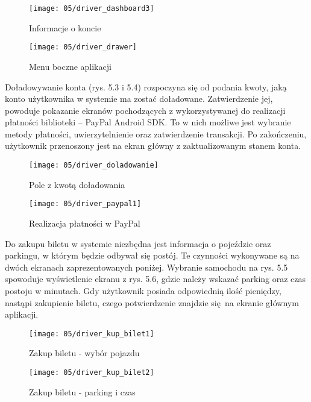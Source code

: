 \begin{figure}[h]
	\centering
	\begin{minipage}[b]{0.25\textwidth}
		\texttt{[image: 05/driver\_dashboard3]}
		\caption{Informacje o koncie}
	\end{minipage}
	\hspace{3cm}
	\begin{minipage}[b]{0.25\textwidth}
		\texttt{[image: 05/driver\_drawer]}
		\caption{Menu boczne aplikacji}
	\end{minipage}
\end{figure}

Doładowywanie konta (rys. 5.3 i 5.4) rozpoczyna się od podania kwoty, jaką konto użytkownika w systemie ma zostać doładowane. Zatwierdzenie jej, powoduje pokazanie ekranów pochodzących z wykorzystywanej do realizacji płatności biblioteki -- PayPal Android SDK. To w nich możliwe jest wybranie metody płatności, uwierzytelnienie oraz zatwierdzenie transakcji. Po zakończeniu, użytkownik przenoszony jest na ekran główny z zaktualizowanym stanem konta.

\newpage

\begin{figure}[h!]
	\centering
	\begin{minipage}[b]{0.25\textwidth}
		\texttt{[image: 05/driver\_doladowanie]}
		\caption{Pole z kwotą doładowania}
	\end{minipage}
	\hspace{3cm}
	\begin{minipage}[b]{0.25\textwidth}
		\texttt{[image: 05/driver\_paypal1]}
		\caption{Realizacja płatności w PayPal}
	\end{minipage}
\end{figure}

Do zakupu biletu w systemie niezbędna jest informacja o pojeździe oraz parkingu, w którym będzie odbywał się postój. Te czynności wykonywane są na dwóch ekranach zaprezentowanych poniżej. Wybranie samochodu na rys. 5.5 spowoduje wyświetlenie ekranu z rys. 5.6, gdzie należy wskazać parking oraz czas postoju w minutach. Gdy użytkownik posiada odpowiednią ilość pieniędzy, nastąpi zakupienie biletu, czego potwierdzenie znajdzie się na ekranie głównym aplikacji.

\begin{figure}[h!]
	\centering
	\begin{minipage}[b]{0.25\textwidth}
		\texttt{[image: 05/driver\_kup\_bilet1]}
		\caption{Zakup biletu - wybór pojazdu}
	\end{minipage}
	\hspace{3cm}
	\begin{minipage}[b]{0.25\textwidth}
		\texttt{[image: 05/driver\_kup\_bilet2]}
		\caption{Zakup biletu - parking i czas}
	\end{minipage}
\end{figure}


